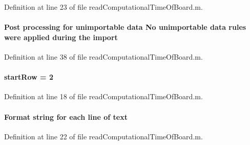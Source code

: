 Definition at line 23 of file read\+Computational\+Time\+Of\+Board.\+m.

\hypertarget{a00114_a97736099a9ac43f989770145ce6b9935}{}
\paragraph[{import}]{\setlength{\rightskip}{0pt plus 5cm}Post processing for unimportable {\bf data} No unimportable {\bf data} rules were applied during the import}\label{a00114_a97736099a9ac43f989770145ce6b9935}


Definition at line 38 of file read\+Computational\+Time\+Of\+Board.\+m.

\hypertarget{a00114_a987da3ccdd04c7003429ef9f85a24f24}{}
\paragraph[{start\+Row}]{\setlength{\rightskip}{0pt plus 5cm}start\+Row = 2}\label{a00114_a987da3ccdd04c7003429ef9f85a24f24}


Definition at line 18 of file read\+Computational\+Time\+Of\+Board.\+m.

\hypertarget{a00114_ac3ed6ea030e1a1d6234b110347cad11e}{}
\paragraph[{text}]{\setlength{\rightskip}{0pt plus 5cm}Format string for each line of text}\label{a00114_ac3ed6ea030e1a1d6234b110347cad11e}


Definition at line 22 of file read\+Computational\+Time\+Of\+Board.\+m.

